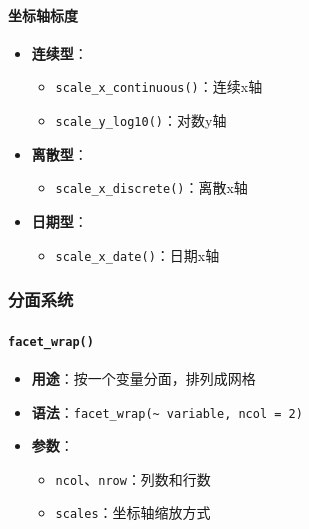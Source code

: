 \documentclass[
  twoside]{book}
\providecommand{\tightlist}{%
  \setlength{\itemsep}{0pt}\setlength{\parskip}{0pt}}
\begin{document}
\hypertarget{ux5750ux6807ux8f74ux6807ux5ea6}{%
\paragraph{坐标轴标度}\label{ux5750ux6807ux8f74ux6807ux5ea6}}

\begin{itemize}
\tightlist
\item
  \textbf{连续型}：

  \begin{itemize}
  \tightlist
  \item
    \texttt{scale\_x\_continuous()}：连续x轴
  \item
    \texttt{scale\_y\_log10()}：对数y轴
  \end{itemize}
\item
  \textbf{离散型}：

  \begin{itemize}
  \tightlist
  \item
    \texttt{scale\_x\_discrete()}：离散x轴
  \end{itemize}
\item
  \textbf{日期型}：

  \begin{itemize}
  \tightlist
  \item
    \texttt{scale\_x\_date()}：日期x轴
  \end{itemize}
\end{itemize}

\hypertarget{ux5206ux9762ux7cfbux7edf}{%
\subsubsection{分面系统}\label{ux5206ux9762ux7cfbux7edf}}

\hypertarget{facet_wrap}{%
\paragraph{\texorpdfstring{\texttt{facet\_wrap()}}{facet\_wrap()}}\label{facet_wrap}}

\begin{itemize}
\tightlist
\item
  \textbf{用途}：按一个变量分面，排列成网格
\item
  \textbf{语法}：\texttt{facet\_wrap(\textasciitilde{}\ variable,\ ncol\ =\ 2)}
\item
  \textbf{参数}：

  \begin{itemize}
  \tightlist
  \item
    \texttt{ncol}、\texttt{nrow}：列数和行数
  \item
    \texttt{scales}：坐标轴缩放方式
  \end{itemize}
\end{itemize}
\end{document}
